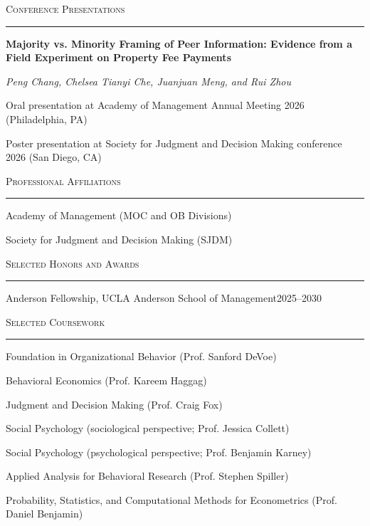 \documentclass[10pt]{article}
\newcommand{\supporttext}[1]{{\normalsize #1}}
\newcommand{\supportemph}[1]{{\normalsize\emph{#1}}}
\newcommand{\cvsection}[1]{%
  \vspace{1.18em}%
  {\Large\scshape #1\par}%
  \vspace{0.08em}%
  {\color{rulegray}\rule{\textwidth}{0.35pt}\par}%
  \vspace{0.18em}%
}
\newcommand{\conferenceentry}[2]{%
  \textbf{#1}\par
  \vspace{0.1em}%
  \supportemph{#2}\par
  \vspace{0.25em}%
}
\newcommand{\conferencebullet}[1]{\hspace*{0.75em}\textbullet\hspace{0.55em}#1\par\vspace{0.14em}}
\newcommand{\sectiontail}[1]{\vspace{#1}}
\newcommand{\simpleentry}[1]{#1\par\vspace{0.18em}}
\newcommand{\datedentry}[2]{#1\hfill #2\par\vspace{0.18em}}
\newcommand{\coursegroup}[1]{\vspace{0.24em}{\normalsize\bfseries #1\par}\vspace{0.1em}}
\newcommand{\courseline}[1]{\supporttext{#1}\par\vspace{0.08em}}
\begin{document}
\newpage
\cvsection{Conference Presentations}
\conferenceentry{Majority vs. Minority Framing of Peer Information: Evidence from a Field Experiment on Property Fee Payments}{Peng Chang, Chelsea Tianyi Che, Juanjuan Meng, and Rui Zhou}
\conferencebullet{Oral presentation at Academy of Management Annual Meeting 2026 (Philadelphia, PA)}
\conferencebullet{Poster presentation at Society for Judgment and Decision Making conference 2026 (San Diego, CA)}

\cvsection{Professional Affiliations}
\simpleentry{Academy of Management (MOC and OB Divisions)}
\simpleentry{Society for Judgment and Decision Making (SJDM)}
\sectiontail{0.54em}

\cvsection{Selected Honors and Awards}
\datedentry{Anderson Fellowship, UCLA Anderson School of Management}{2025--2030}
\sectiontail{0.54em}

\cvsection{Selected Coursework}
\coursegroup{Behavioral Decision Making \& Organizations}
\courseline{Foundation in Organizational Behavior (Prof. Sanford DeVoe)}
\courseline{Behavioral Economics (Prof. Kareem Haggag)}
\courseline{Judgment and Decision Making (Prof. Craig Fox)}
\courseline{Social Psychology (sociological perspective; Prof. Jessica Collett)}
\courseline{Social Psychology (psychological perspective; Prof. Benjamin Karney)}
\coursegroup{Research Methods}
\courseline{Applied Analysis for Behavioral Research (Prof. Stephen Spiller)}
\courseline{Probability, Statistics, and Computational Methods for Econometrics (Prof. Daniel Benjamin)}
\end{document}
